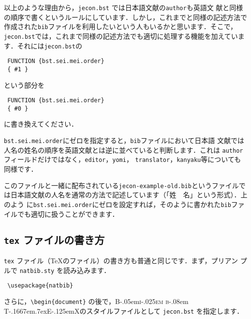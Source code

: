 \documentclass[article]{jlreq}
\newcommand{\BibTeX}{\textrm{B\kern-.05em\textsc{i\kern-.025em b}\kern-.08em%
T\kern-.1667em\lower.7ex\hbox{E}\kern-.125emX}}
\begin{document}
\vspace*{1em}

以上のような理由から，\texttt{jecon.bst} では日本語文献の\texttt{author}も英語文
献と同様の順序で書くというルールにしています．しかし，これまでと同様の記述方法で
作成された\texttt{bib}ファイルを利用したいという人もいるかと思います．そこで，
\texttt{jecon.bst}では，これまで同様の記述方法でも適切に処理する機能を加えていま
す．それには\texttt{jecon.bst}の
\begin{screen}
\begin{verbatim}
 FUNCTION {bst.sei.mei.order}
 { #1 }
\end{verbatim}
\end{screen}
という部分を
\begin{screen}
\begin{verbatim}
 FUNCTION {bst.sei.mei.order}
 { #0 }
\end{verbatim}
\end{screen}
に書き換えてください．

\texttt{bst.sei.mei.order}にゼロを指定すると，\texttt{bib}ファイルにおいて日本語
文献では人名の姓名の順序を英語文献とは逆に並べていると判断します．これは
\texttt{author}フィールドだけではなく，\texttt{editor}，\texttt{yomi}，
\texttt{translator}，\texttt{kanyaku}等についても同様です．
\vspace*{1em}

このファイルと一緒に配布されている\texttt{jecon-example-old.bib}というファイルで
は日本語文献の人名を通常の方法で記述しています（「姓　名」という形式）．上のよう
に\texttt{bst.sei.mei.order}にゼロを設定すれば，そのように書かれた\texttt{bib}ファ
イルでも適切に扱うことができます．

\vspace*{1em}

\subsection{\texttt{tex} ファイルの書き方}

\texttt{tex} ファイル（\TeX のファイル）の書き方も普通と同じです．まず，プリアン
プルで \texttt{natbib.sty} を読み込みます．

\begin{screen}
\begin{verbatim}
 \usepackage{natbib}
\end{verbatim}
\end{screen}

さらに，\verb|\begin{document}| の後で，\BibTeX のスタイルファイルとして 
\texttt{jecon.bst} を指定します．
\end{document}
